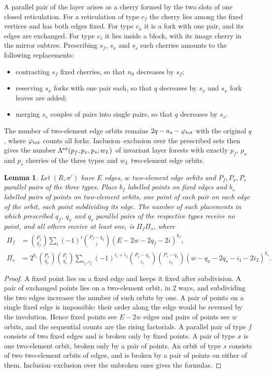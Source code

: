 \documentclass[11pt,a4paper]{article}
\newtheorem{lemma}[theorem]{Lemma}
\theoremstyle{definition}
\newcommand{\rise}[2]{#1^{\overline{#2}}}
\begin{document}
A parallel pair of the layer arises as a cherry formed by the two slots of one closed reticulation. For a reticulation of type $c_f$ the cherry lies among the fixed vertices and has both edges fixed. For type $c_x$ it is a fork with one pair, and its edges are exchanged. For type $c_s$ it lies inside a block, with its image cherry in the mirror subtree. Prescribing $s_f$, $s_x$ and $s_s$ such cherries amounts to the following replacements:
\begin{itemize}
\item contracting $s_f$ fixed cherries, so that $n_0$ decreases by $s_f$;
\item reserving $s_x$ forks with one pair each, so that $q$ decreases by $s_x$ and $s_x$ fork leaves are added;
\item merging $s_s$ couples of pairs into single pairs, so that $q$ decreases by $s_s$.
\end{itemize}
The number of two-element edge orbits remains $2q-a_s-\varphi_{\rm tot}$ with the original $q$, where $\varphi_{\rm tot}$ counts all forks. Inclusion–exclusion over the prescribed sets then gives the number $\Lambda^{\rm ex}(p_f,p_x,p_s;w_L)$ of invariant layer forests with exactly $p_f$, $p_x$ and $p_s$ cherries of the three types and $w_L$ two-element edge orbits.

\begin{lemma}\label{lem:eqplace}
Let $(R,\sigma')$ have $E$ edges, $w$ two-element edge orbits and $P_f,P_x,P_s$ parallel pairs of the three types. Place $b_f$ labelled points on fixed edges and $b_s$ labelled pairs of points on two-element orbits, one point of each pair on each edge of the orbit, each point subdividing its edge. The number of such placements in which prescribed $q_f$, $q_x$ and $q_s$ parallel pairs of the respective types receive no point, and all others receive at least one, is $\Pi_f\Pi_s$, where
\begin{align*}
\Pi_f&=\binom{P_f}{q_f}\sum_{i}(-1)^i\binom{P_f-q_f}{i}\rise{(E-2w-2q_f-2i)}{b_f},\\
\Pi_s&=2^{b_s}\binom{P_x}{q_x}\binom{P_s}{q_s}\sum_{i_1,i_2}(-1)^{i_1+i_2}\binom{P_x-q_x}{i_1}\binom{P_s-q_s}{i_2}\rise{(w-q_x-2q_s-i_1-2i_2)}{b_s}.
\end{align*}
\end{lemma}

\begin{proof}
A fixed point lies on a fixed edge and keeps it fixed after subdivision. A pair of exchanged points lies on a two-element orbit, in $2$ ways, and subdividing the two edges increases the number of such orbits by one. A pair of points on a single fixed edge is impossible: their order along the edge would be reversed by the involution. Hence fixed points see $E-2w$ edges and pairs of points see $w$ orbits, and the sequential counts are the rising factorials. A parallel pair of type $f$ consists of two fixed edges and is broken only by fixed points. A pair of type $x$ is one two-element orbit, broken only by a pair of points. An orbit of type $s$ consists of two two-element orbits of edges, and is broken by a pair of points on either of them. Inclusion–exclusion over the unbroken ones gives the formulas.
\end{proof}
\end{document}
